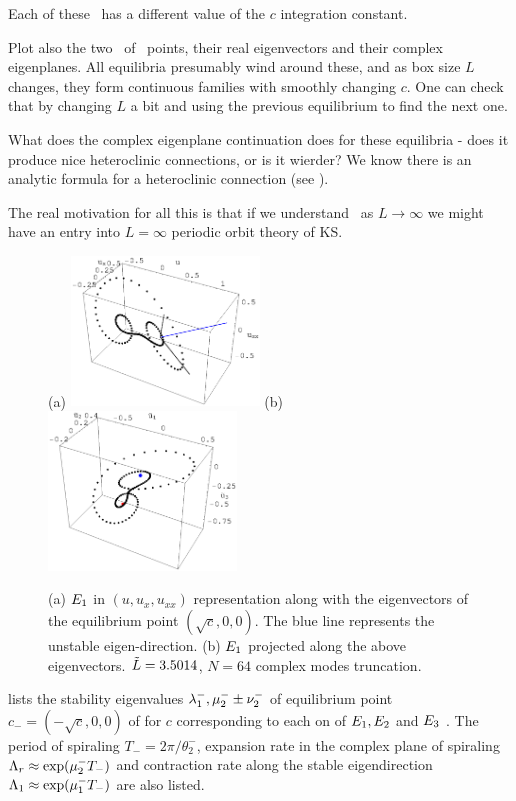 Each of these \eqva\ has a different value of the $c$ integration
constant.

Plot also the two \eqva\ of \eqva\ points, their
real eigenvectors and their complex eigenplanes. All equilibria presumably
wind around these, and as box size $L$ changes, they form continuous
families with smoothly changing $c$. One can check that by
changing $L$ a bit and using the previous equilibrium to find the next
one.

What does the complex eigenplane continuation does for these
equilibria - does it produce nice heteroclinic connections, or is it
wierder? We know there is an analytic formula for a heteroclinic
connection (see ). %

The real motivation for all this is that if we understand \eqva\ as
$L \to \infty$ we might have an entry into $L = \infty$ periodic orbit
theory of KS.

\begin{figure}[h]
\centering
(a) \includegraphics[width=5.0cm]{figs/1wSteadyE.eps}
\hspace{0.1in}
(b) \includegraphics[width=5.0cm]{figs/1wSteadyP.eps}
\caption{
\small{
(a) $\EQV{1}$ in $(u,u_x,u_{xx})$ representation along with the eigenvectors of the equilibrium
point $(\sqrt{c},0,0)$. The blue line represents the unstable eigen-direction.
(b) $\EQV{1}$ projected along the above eigenvectors. $\tildeL=3.5014$, $N=64$ complex modes truncation.
}
}
\label{f:1wSteady}
\end{figure}

 lists the stability eigenvalues
$\eigExp[1]^-,\eigRe[2]^-\pm\eigIm[2]^-$
of equilibrium point $c_{-}=(-\sqrt{c},0,0)$
of \label{eq:3dks} for $c$ corresponding to each on of $\EQV{1},\EQV{2}$ and $\EQV{3}$ \eqva.
The period of spiraling $T_{-}=2\pi/\theta^-_2$, expansion
rate in the complex plane of spiraling
$\ExpaEig_r\approx\exp(\eigRe[2]^- T_-)$ and contraction
rate along the stable eigendirection
$\ExpaEig_1\approx\exp(\eigRe[1]^- T_-)$ are also listed.

